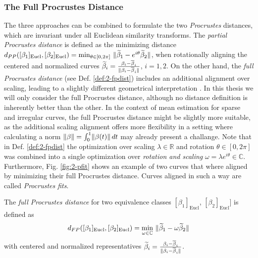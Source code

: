 \subsubsection*{The Full Procrustes Distance}
The three approaches can be combined to formulate the two \emph{Procrustes} distances, which are invariant under all Euclidean similarity transforms.
The \emph{partial Procrustes distance} is defined as the minimizing distance $d_{PP}([\beta_1]_\text{Eucl}, [\beta_2]_\text{Eucl}) = \min_{\theta \in [0,2\pi]} \,\, \lVert\widetilde\beta_1 - e^{i\theta} \widetilde\beta_2\rVert$, when rotationally aligning the centered and normalized curves $\widetilde\beta_i= \frac{\beta_i - \overline\beta_i}{\lVert\beta_i - \overline\beta_i\rVert}$, $i=1,2$.
On the other hand, the \emph{full Procrustes distance} (see Def. \ref{def:2-fpdist}) includes an additional alignment over scaling, leading to a slightly different geometrical interpretation \parencite[see][77-78]{DrydenMardia2016}.
In this thesis we will only consider the full Procrustes distance, although no distance definition is inherently better than the other.
In the context of mean estimation for sparse and irregular curves, the full Procrustes distance might be slightly more suitable, as the additional scaling alignment offers more flexibility in a setting where calculating a norm $\lVert\beta\rVert = \int_0^1 \lVert\beta(t)\rVert\, dt$ may already present a challange.
Note that in Def. \ref{def:2-fpdist} the optimization over scaling $\lambda \in \mathbb{R}$ and rotation $\theta \in [0,2\pi]$ was combined into a single optimization over \emph{rotation and scaling} $\omega = \lambda e^{i\theta} \in \mathbb{C}$.
Furthermore, Fig. \ref{fig:2-pfit} shows an example of two curves that where aligned by minimizing their full Procrustes distance.
Curves aligned in such a way are called \emph{Procrustes fits}.
\begin{definition}
  \label{def:2-fpdist}
  The \emph{full Procrustes distance} for two equivalence classes $[\beta_1]_\text{Eucl}$, $[\beta_2]_\text{Eucl}]$ is defined as
  \begin{equation}
    \label{eq:2-fpdist-def}
    d_{FP}([\beta_1]_\text{Eucl}, [\beta_2]_\text{Eucl}) = \min_{\omega \in \mathbb{C}} \,\, \lVert\widetilde\beta_1 - \omega \widetilde\beta_2\rVert
  \end{equation}
  with centered and normalized representatives $\widetilde\beta_i = \frac{\beta_i - \overline\beta_i}{\lVert\beta_i - \overline\beta_i\rVert}$.
\end{definition}

